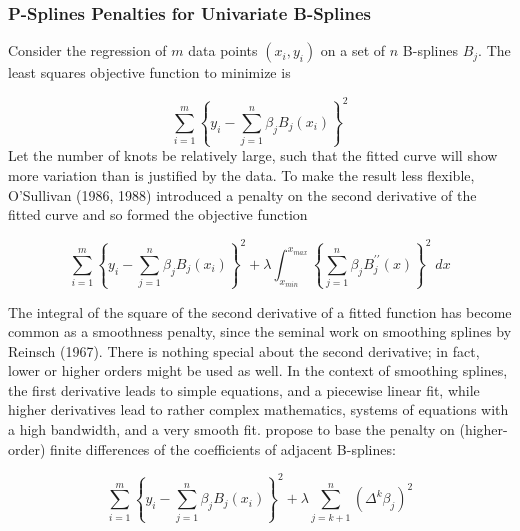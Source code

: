 \documentclass[12pt]{article}
\newcommand*\needsparaphrased{\color{red}}
\newcommand*\outlineskeleton{\color{green}}
\begin{document}
{\subsubsection{{\outlineskeleton P-Splines Penalties for Univariate B-Splines}}

Consider the regression of $m$ data points $\left(x_i,y_i\right)$ on a set of $n$ B-splines $B_j$. The least squares objective function to minimize is

\begin{equation} \label{eq:univariate_bspline_SSE}
\sum_{i=1}^m \left\{ y_i - \sum_{j=1}^n \beta_j B_j\left(x_i\right) \right\}^2
\end{equation}
\noindent
{ \needsparaphrased Let the number of knots be relatively large, such that the fitted curve will show more variation than is justified by the data. To make the result less flexible, O'Sullivan (1986, 1988) introduced a penalty on the second derivative of the fitted curve and so formed the objective function}

\begin{equation} \label{eq:univariate_bspline_ridge_penalty}
\sum_{i=1}^m \left \{ y_i - \sum_{j=1}^n \beta_j B_j\left(x_i\right) \right \}^2 + \lambda \int_{x_{min}}^{x_{max}} \left\{  \sum_{j=1}^n \beta_j B^{\prime \prime}_j\left(x\right) \right\}^2 \; dx
\end{equation}

{ \needsparaphrased The integral of the square of the second derivative of a fitted function has become common as a smoothness penalty, since the seminal work on smoothing splines by Reinsch (1967). There is nothing special about the second derivative; in fact, lower or higher orders might be used as well. In the context of smoothing splines, the first derivative leads to simple equations, and a piecewise linear fit, while higher derivatives lead to rather complex mathematics, systems of equations with a high bandwidth, and a very smooth fit. \cite{eilers1996flexible} propose to base the penalty on (higher-order) finite differences of the coefficients of adjacent B-splines:}

\begin{equation} \label{eq:univariate_pspline_diff_penalty}
\sum_{i=1}^m \left \{ y_i - \sum_{j=1}^n \beta_j B_j\left(x_i\right) \right \}^2 + \lambda \sum_{j=k+1}^n \left( \Delta^k \beta_j  \right)^2
\end{equation}

}
\end{document}
